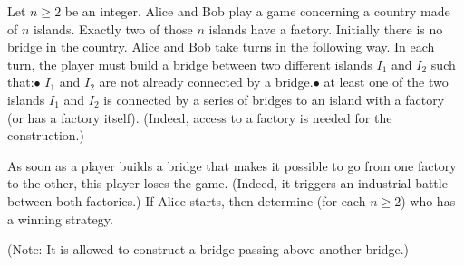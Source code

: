 Let $n\geq 2$ be an integer. Alice and Bob play a game concerning a country made of $n$ islands. Exactly two of those $n$ islands have a factory. Initially there is no bridge in the country. Alice and Bob take turns in the following way. In each turn, the player must build a bridge between two different islands $I_1$ and $I_2$ such that:$\bullet$ $I_1$ and $I_2$ are not already connected by a bridge.$\bullet$ at least one of the two islands $I_1$ and $I_2$ is connected by a series of bridges to an island with a factory (or has a factory itself). (Indeed, access to a factory is needed for the construction.)

As soon as a player builds a bridge that makes it possible to go from one factory to the other, this player loses the game. (Indeed, it triggers an industrial battle between both factories.) If Alice starts, then determine (for each $n\geq  2$) who has a winning strategy.

(Note: It is allowed to construct a bridge passing above another bridge.)